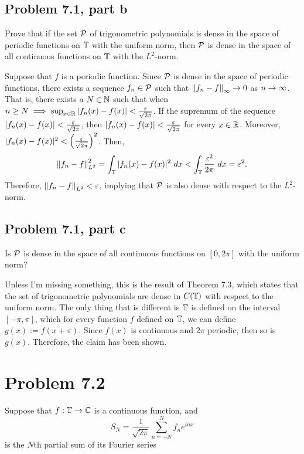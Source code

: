 \subsection{Problem 7.1, part b}
Prove that if the set $\mathcal{P}$ of trigonometric polynomials is dense in the space of periodic functions on $\mathbb{T}$ with the uniform norm, then $\mathcal{P}$ is dense in the space of all continuous functions on $\mathbb{T}$ with the $L^2$-norm.
\partbreak
\begin{solution}

    Suppose that $f$ is a periodic function. Since $\mathcal{P}$ is dense in the space of periodic functions, there exists a sequence $f_n \in \mathcal{P}$ such that $\norm{f_n - f}_{\infty} \rightarrow 0$ as $n \rightarrow \infty$. That is, there exists a $N \in \mathbb{N}$ such that when $n \geq N \implies \sup_{x \in \mathbb{R}}|f_n(x) - f(x)| < \frac{\varepsilon}{\sqrt{2\pi}}$. If the supremum of the sequence $|f_n(x) - f(x)| < \frac{\varepsilon}{\sqrt{2\pi}}$, then $|f_n(x) - f(x)| < \frac{\varepsilon}{\sqrt{2\pi}}$ for every $x \in \mathbb{R}$. Moreover, $|f_n(x) - f(x)|^2 < \left(\frac{\varepsilon}{\sqrt{2\pi}}\right)^2$. Then, 
    \[\norm{f_n - f}_{L^2}^2 = \int_{\mathbb{T}} |f_n(x) - f(x)|^2 \ dx < \int_{\mathbb{T}} \frac{\varepsilon^2}{2\pi} \ dx= \varepsilon^2.\]
    Therefore, $\norm{f_n - f}_{L^2} < \varepsilon$, implying that $\mathcal{P}$ is also dense with respect to the $L^2$-norm. 

\end{solution}


\newpage
\subsection{Problem 7.1, part c}
Is $\mathcal{P}$ is dense in the space of all continuous functions on $[0, 2\pi]$ with the uniform norm?
\partbreak
\begin{solution}

    Unless I'm missing something, this is the result of Theorem 7.3, which states that the set of trigonometric polynomials are dense in $C(\mathbb{T})$ with respect to the uniform norm. The only thing that is different is $\mathbb{T}$ is defined on the interval $[-\pi, \pi]$, which for every function $f$ defined on $\mathbb{T}$, we can define $g(x) := f(x+\pi)$. Since $f(x)$ is continuous and $2\pi$ periodic, then so is $g(x)$. Therefore, the claim has been shown.  
\end{solution}
\newpage
\section{Problem 7.2}
Suppose that $f: \mathbb{T} \rightarrow \mathbb{C}$ is a continuous function, and 
\[S_N = \frac{1}{\sqrt{2\pi}} \sum_{n = -N}^{N} \hat{f}_n e^{inx} \]
is the $N$th partial sum of its Fourier series

